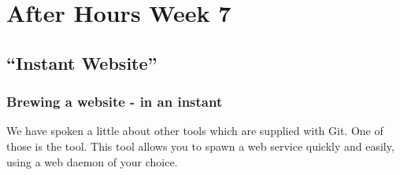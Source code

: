 \chapter{After Hours Week 7}
\section{``Instant Website''}
\subsection{Brewing a website - in an instant}
We have spoken a little about other tools which are supplied with Git.
One of those is the  tool.
This tool allows you to spawn a web service quickly and easily, using a web daemon of your choice.

